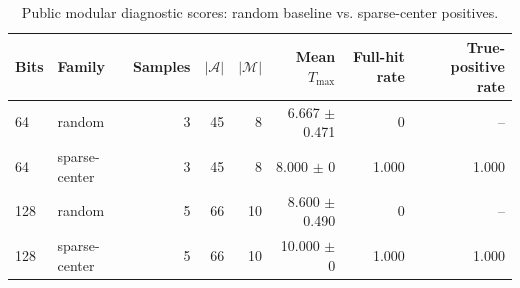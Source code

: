 \begin{table}[htbp]
\centering
\caption{Public modular diagnostic scores: random baseline vs. sparse-center positives.}
\label{tab:diagnostic-scores}
\begin{tabular}{@{}llrrrrrr@{}}
\toprule
Bits & Family & Samples & $|\mathcal A|$ & $|\mathcal M|$ & Mean $T_{\max}$ & Full-hit rate & True-positive rate \\
\midrule
64 & random & 3 & 45 & 8 & 6.667 $\pm$ 0.471 & 0 & -- \\
64 & sparse-center & 3 & 45 & 8 & 8.000 $\pm$ 0 & 1.000 & 1.000 \\
128 & random & 5 & 66 & 10 & 8.600 $\pm$ 0.490 & 0 & -- \\
128 & sparse-center & 5 & 66 & 10 & 10.000 $\pm$ 0 & 1.000 & 1.000 \\
\bottomrule
\end{tabular}
\end{table}
